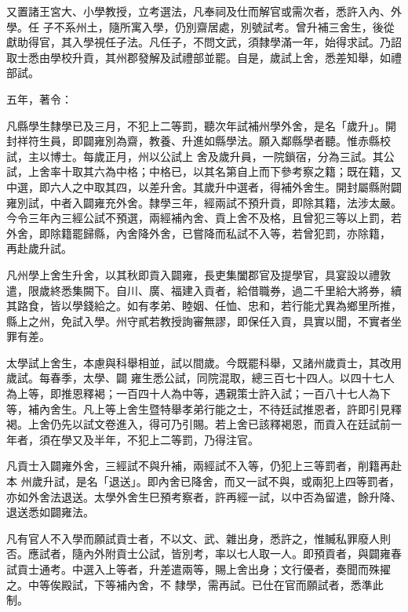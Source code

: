 \begin{pinyinscope}
 又置諸王宮大、小學教授，立考選法，凡奉祠及仕而解官或需次者，悉許入內、外學。任
 子不系州土，隨所寓入學，仍別齋居處，別號試考。曾升補三舍生，後從獻助得官，其入學視任子法。凡任子，不問文武，須隸學滿一年，始得求試。乃詔取士悉由學校升貢，其州郡發解及試禮部並罷。自是，歲試上舍，悉差知舉，如禮部試。



 五年，著令：



 凡縣學生隸學已及三月，不犯上二等罰，聽次年試補州學外舍，是名「歲升」。開封祥符生員，即闢雍別為齋，教養、升進如縣學法。願入鄰縣學者聽。惟赤縣校試，主以博士。每歲正月，州以公試上
 舍及歲升員，一院鎖宿，分為三試。其公試，上舍率十取其六為中格；中格已，以其名第自上而下參考察之籍；既在籍，又中選，即六人之中取其四，以差升舍。其歲升中選者，得補外舍生。開封屬縣附闢雍別試，中者入闢雍充外舍。隸學三年，經兩試不預升貢，即除其籍，法涉太嚴。今令三年內三經公試不預選，兩經補內舍、貢上舍不及格，且曾犯三等以上罰，若外舍，即除籍罷歸縣，內舍降外舍，已嘗降而私試不入等，若曾犯罰，亦除籍，
 再赴歲升試。



 凡州學上舍生升舍，以其秋即貢入闢雍，長吏集闔郡官及提學官，具宴設以禮敦遣，限歲終悉集闕下。自川、廣、福建入貢者，給借職券，過二千里給大將券，續其路食，皆以學錢給之。如有孝弟、睦姻、任恤、忠和，若行能尤異為鄉里所推，縣上之州，免試入學。州守貳若教授詢審無謬，即保任入貢，具實以聞，不實者坐罪有差。



 太學試上舍生，本慮與科舉相並，試以間歲。今既罷科舉，又諸州歲貢士，其改用歲試。每春季，太學、闢
 雍生悉公試，同院混取，總三百七十四人。以四十七人為上等，即推恩釋褐；一百四十人為中等，遇親策士許入試；一百八十七人為下等，補內舍生。凡上等上舍生暨特舉孝弟行能之士，不待廷試推恩者，許即引見釋褐。上舍仍先以試文卷進入，得可乃引賜。若上舍已該釋褐恩，而貢入在廷試前一年者，須在學又及半年，不犯上二等罰，乃得注官。



 凡貢士入闢雍外舍，三經試不與升補，兩經試不入等，仍犯上三等罰者，削籍再赴本
 州歲升試，是名「退送」。即內舍已降舍，而又一試不與，或兩犯上四等罰者，亦如外舍法退送。太學外舍生巳預考察者，許再經一試，以中否為留遣，餘升降、退送悉如闢雍法。



 凡有官人不入學而願試貢士者，不以文、武、雜出身，悉許之，惟贓私罪廢人則否。應試者，隨內外附貢士公試，皆別考，率以七人取一人。即預貢者，與闢雍春試貢士通考。中選入上等者，升差遣兩等，賜上舍出身；文行優者，奏聞而殊擢之。中等俟殿試，下等補內舍，不
 隸學，需再試。已仕在官而願試者，悉準此制。




\end{pinyinscope}
